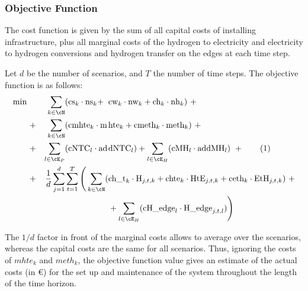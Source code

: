 \documentclass[smallextended,natbib]{svjour3}       %
\numberwithin{theorem}{section}
\begin{document}

\subsubsection{Objective Function}

The cost function is given by the sum of all capital costs of installing infrastructure, plus all marginal costs of the hydrogen to electricity and electricity to hydrogen conversions and hydrogen transfer on the edges at each time step.

Let $d$ be the number of scenarios, and $T$ the number of time steps. The objective function is as follows:
\begin{align*}
    \min \ 
    &&\sum_{k\in\cN}&(\text{cs}_k \cdot \text{ns}_k+\hspace{-1em}&&\text{cw}_k \cdot \text{nw}_k + \text{ch}_k \cdot \text{nh}_k )\ + \\
    &+& \sum_{k\in\cN}&(\text{cmhte}_k\cdot\text{m} \hspace{-1em}&& \text{hte}_k + \text{cmeth}_k\cdot \text{meth}_k) \ + \\
    &+& \sum_{l\in\cE_P}& (\text{cNTC}_l\cdot \text{ad}\hspace{-1em}&&\text{dNTC}_l) 
    + \sum_{l\in\cE_H} (\text{cMH}_l\cdot \text{addMH}_l) \ + \stepcounter{equation}\tag{\theequation}\label{objVal} \\   
    &+&\frac{1}{d}\sum_{j=1}^{d}&\sum_{t=1}^{T} \Bigg(\sum_{k\in\cN} (\hspace{-1em} &&
    \text{ch\_t}_k \cdot \text{H}_{j,t,k} + \text{chte}_k \cdot \text{HtE}_{j,t,k} + \text{ceth}_k \cdot \text{EtH}_{j,t,k})\ + \\
    &&&\hspace{-2em}&&+\sum_{l\in\cE_H} (\text{cH\_edge}_l\cdot\text{H\_edge}_{j,t,l}) \Bigg)
\end{align*}

The $1/d$ factor in front of the marginal costs allows to average over the scenarios, whereas the capital costs are the same for all scenarios. 
Thus, ignoring the costs of $mhte_k$ and $meth_k$, the objective function value gives an estimate of the actual costs (in \euro) for the set up and maintenance of the system throughout the length of the time horizon. 


\end{document}
